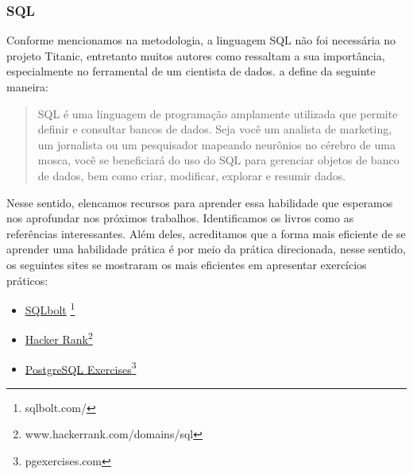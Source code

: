  \subsubsection{SQL}
Conforme mencionamos na metodologia, a linguagem SQL não foi necessária no projeto Titanic, entretanto muitos autores como \cite{SCRATCH,DATAPYTHON} ressaltam a sua importância, especialmente no ferramental de um cientista de dados. \cite{debarros2022practical} a define da seguinte maneira:
\begin{quote}
    SQL é uma linguagem de programação amplamente utilizada que permite definir e consultar bancos de dados. Seja você um analista de marketing, um jornalista ou um pesquisador mapeando neurônios no cérebro de uma mosca, você se beneficiará do uso do SQL para gerenciar objetos de banco de dados, bem como criar, modificar, explorar e resumir dados. 
\end{quote}

Nesse sentido, elencamos recursos para aprender essa habilidade que esperamos nos aprofundar nos próximos trabalhos. Identificamos os livros \cite{debarros2022practical,Silberschatz2019DBS} como as referências interessantes. Além deles, acreditamos que a forma mais eficiente de se aprender uma habilidade prática é por meio da prática direcionada, nesse sentido, os seguintes sites se mostraram os mais eficientes em apresentar exercícios práticos: 
\begin{itemize}
\item \href{https://sqlbolt.com/}{SQLbolt} \footnote{sqlbolt.com/}
\item \href{https://www.hackerrank.com/domains/sql}{Hacker Rank}\footnote{www.hackerrank.com/domains/sql}
\item \href{https://pgexercises.com/}{PostgreSQL Exercises}\footnote{pgexercises.com}
\end{itemize}
 
